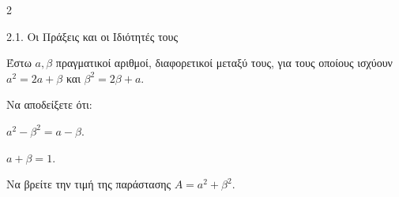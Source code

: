 \begin{ylh}{2}
    \item 2.1. Οι Πράξεις και οι Ιδιότητές τους
\end{ylh}
Έστω $a, \beta$ πραγματικοί αριθμοί, διαφορετικοί μεταξύ τους, για τους οποίους ισχύουν $a^2 = 2a + \beta$ και $\beta^2 = 2\beta + a$.
\begin{alist}
\item Να αποδείξετε ότι:
\begin{rlist}
\item $a^2 - \beta^2 = a - \beta$.
\item $a + \beta = 1$.
\end{rlist}
\item Να βρείτε την τιμή της παράστασης $A = a^2 + \beta^2$.
\end{alist}

